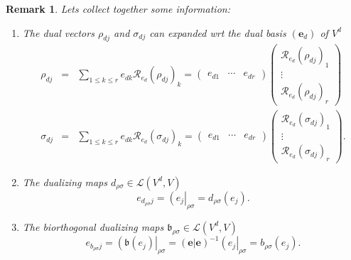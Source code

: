 \documentclass[aps,preprint]{revtex4}
\newtheorem{remark}[theorem]{Remark}
\begin{document}
\begin{remark}
Lets collect together some information:

\begin{enumerate}
\item The dual vectors $\rho _{dj}$ and $\sigma _{dj}$ can expanded wrt the
dual basis $\left( \boldsymbol{e}_{d}\right) $ of $V^{d}$ 
\begin{eqnarray}
\rho _{dj} &=&\sum_{1\leq k\leq r}e_{dk}\mathcal{R}_{e_{d}}\left( \rho
_{dj}\right) _{k}=\left( 
\begin{array}{ccc}
e_{d1} & \cdots & e_{dr}%
\end{array}%
\right) \left( 
\begin{array}{c}
\mathcal{R}_{e_{d}}\left( \rho _{dj}\right) _{1} \\ 
\vdots \\ 
\mathcal{R}_{e_{d}}\left( \rho _{dj}\right) _{r}%
\end{array}%
\right) \\
\sigma _{dj} &=&\sum_{1\leq k\leq r}e_{dk}\mathcal{R}_{e_{d}}\left( \sigma
_{dj}\right) _{k}=\left( 
\begin{array}{ccc}
e_{d1} & \cdots & e_{dr}%
\end{array}%
\right) \left( 
\begin{array}{c}
\mathcal{R}_{e_{d}}\left( \sigma _{dj}\right) _{1} \\ 
\vdots \\ 
\mathcal{R}_{e_{d}}\left( \sigma _{dj}\right) _{r}%
\end{array}%
\right) .
\end{eqnarray}

\item The dualizing maps $d_{\rho \sigma }\in \mathcal{L}\left(
V^{d},V\right) $%
\begin{equation}
e_{d_{\rho \sigma }j}=\left( e_{j}\right\vert _{\rho \sigma }=d_{\rho \sigma
}\left( e_{j}\right) .
\end{equation}

\item The biorthogonal dualizing maps $\mathfrak{b}_{\rho \sigma }\in 
\mathcal{L}\left( V^{d},V\right) $%
\begin{equation}
e_{b_{\rho \sigma }j}=\left( \mathfrak{b}\left( e_{j}\right) \right\vert
_{\rho \sigma }=\left( \left. \boldsymbol{e}\right\vert \boldsymbol{e}%
\right) ^{-1}\left( e_{j}\right\vert _{\rho \sigma }=b_{\rho \sigma }\left(
e_{j}\right) .
\end{equation}


\end{enumerate}
\end{remark}
\end{document}
